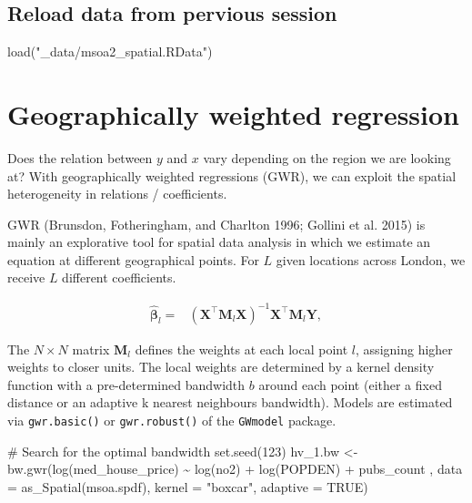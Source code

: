 \documentclass[
  letterpaper,
]{scrbook}
\newenvironment{Shaded}{\begin{snugshade}}{\end{snugshade}}
\newcommand{\AttributeTok}[1]{\textcolor[rgb]{0.40,0.45,0.13}{#1}}
\newcommand{\CommentTok}[1]{\textcolor[rgb]{0.37,0.37,0.37}{#1}}
\newcommand{\ConstantTok}[1]{\textcolor[rgb]{0.56,0.35,0.01}{#1}}
\newcommand{\DecValTok}[1]{\textcolor[rgb]{0.68,0.00,0.00}{#1}}
\newcommand{\FunctionTok}[1]{\textcolor[rgb]{0.28,0.35,0.67}{#1}}
\newcommand{\NormalTok}[1]{\textcolor[rgb]{0.00,0.23,0.31}{#1}}
\newcommand{\OtherTok}[1]{\textcolor[rgb]{0.00,0.23,0.31}{#1}}
\newcommand{\SpecialCharTok}[1]{\textcolor[rgb]{0.37,0.37,0.37}{#1}}
\newcommand{\StringTok}[1]{\textcolor[rgb]{0.13,0.47,0.30}{#1}}
\begin{document}
\hypertarget{reload-data-from-pervious-session-10}{%
\subsection{Reload data from pervious
session}\label{reload-data-from-pervious-session-10}}

\begin{Shaded}
\begin{Highlighting}[]
\FunctionTok{load}\NormalTok{(}\StringTok{"\_data/msoa2\_spatial.RData"}\NormalTok{)}
\end{Highlighting}
\end{Shaded}

\hypertarget{geographically-weighted-regression}{%
\section{Geographically weighted
regression}\label{geographically-weighted-regression}}

Does the relation between \(y\) and \(x\) vary depending on the region
we are looking at? With geographically weighted regressions (GWR), we
can exploit the spatial heterogeneity in relations / coefficients.

GWR (Brunsdon, Fotheringham, and Charlton 1996; Gollini et al. 2015) is
mainly an explorative tool for spatial data analysis in which we
estimate an equation at different geographical points. For \(L\) given
locations across London, we receive \(L\) different coefficients.

\[
\begin{split} 
\hat{\boldsymbol{\mathbf{\beta}}}_l=& ({\boldsymbol{\mathbf{X}}}^\intercal{\boldsymbol{\mathbf{M}}}_l{\boldsymbol{\mathbf{X}}})^{-1}{\boldsymbol{\mathbf{X}}}^\intercal{\boldsymbol{\mathbf{M}}}_l{\boldsymbol{\mathbf{Y}}},
\end{split}
\]

The \(N \times N\) matrix \({\boldsymbol{\mathbf{M}}}_l\) defines the
weights at each local point \(l\), assigning higher weights to closer
units. The local weights are determined by a kernel density function
with a pre-determined bandwidth \(b\) around each point (either a fixed
distance or an adaptive k nearest neighbours bandwidth). Models are
estimated via \texttt{gwr.basic()} or \texttt{gwr.robust()} of the
\texttt{GWmodel} package.

\begin{Shaded}
\begin{Highlighting}[]
\CommentTok{\# Search for the optimal bandwidth }
\FunctionTok{set.seed}\NormalTok{(}\DecValTok{123}\NormalTok{)}
\NormalTok{hv\_1.bw }\OtherTok{\textless{}{-}} \FunctionTok{bw.gwr}\NormalTok{(}\FunctionTok{log}\NormalTok{(med\_house\_price) }\SpecialCharTok{\textasciitilde{}} \FunctionTok{log}\NormalTok{(no2) }\SpecialCharTok{+} \FunctionTok{log}\NormalTok{(POPDEN) }\SpecialCharTok{+}\NormalTok{ pubs\_count ,}
                  \AttributeTok{data =} \FunctionTok{as\_Spatial}\NormalTok{(msoa.spdf),}
                  \AttributeTok{kernel =} \StringTok{"boxcar"}\NormalTok{,}
                  \AttributeTok{adaptive =} \ConstantTok{TRUE}\NormalTok{) }
\end{Highlighting}
\end{Shaded}
\end{document}
